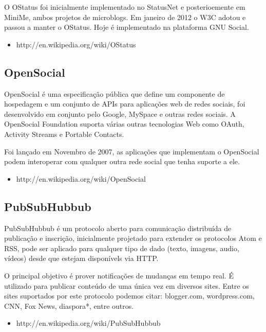 \documentclass[12pt]{article}
\begin{document}
O OStatus foi inicialmente implementado no StatusNet e posterioemente em
MiniMe, ambos projetos de microblogs. Em janeiro de 2012 o W3C adotou e passou a
manter o OStatus. Hoje é implementado na plataforma GNU Social.

\begin{itemize}
  \item http://en.wikipedia.org/wiki/OStatus
\end{itemize}

\subsection{OpenSocial}

OpenSocial é uma especificação pública que define um componente de hospedagem
e um conjunto de APIs para aplicações web de redes sociais, foi desenvolvido
em conjunto pelo Google, MySpace e outras redes sociais. A OpenSocial
Foundation suporta várias outras tecnologias Web como OAuth, Activity Streams
e Portable Contacts.

Foi lançado em Novembro de 2007, as aplicações que implementam o OpenSocial
podem interoperar com qualquer outra rede social que tenha suporte a ele.

\begin{itemize}
  \item http://en.wikipedia.org/wiki/OpenSocial
\end{itemize}

\subsection{PubSubHubbub}

PubSubHubbub é um protocolo aberto para comunicação distribuída de publicação
e inscrição, inicialmente projetado para extender os protocolos Atom e RSS,
pode ser aplicado para qualquer tipo de dado (texto, imagens,
audio, vídeos) desde que estejam disponívels via HTTP.

O principal objetivo é prover notificações de mudanças em tempo real. É
utilizado para publicar conteúdo de uma única vez em diversos sites. Entre os
sites suportados por este protocolo podemos citar: blogger.com, wordpress.com,
CNN, Fox News, diaspora*, entre outros.

\begin{itemize}
  \item http://en.wikipedia.org/wiki/PubSubHubbub
\end{itemize}
\end{document}
